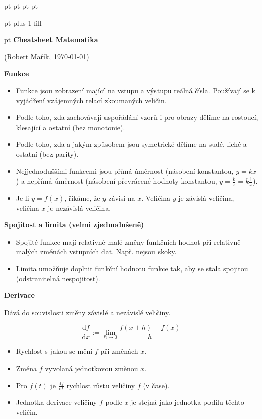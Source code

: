 \documentclass{article}
\begin{document}
 pt
 pt
\let\phi\varphi
\footnotesize
{} pt
 pt
\begin{multicols}{3}
 pt plus 1 fill

{\centering {} pt
\textbf{Cheatsheet Matematika}

(Robert Mařík, \today)

}

\textbf{Funkce}
\vspace*{-\baselineskip}
\begin{itemize}
\item Funkce jsou zobrazení mající na vstupu a výstupu reálná čísla. Používají se k vyjádření vzájemných relací zkoumaných veličin.
\item Podle  toho, zda zachovávají uspořádání vzorů i pro obrazy dělíme na rostoucí, klesající a ostatní (bez monotonie).
\item Podle toho, zda a jakým způsobem jsou symetrické dělíme na sudé, liché a ostatní (bez parity).
\item Nejjednoduššími funkcemi jsou přímá úměrnost (násobení konstantou, $y=kx$) a nepřímá úměrnost (násobení převrácené hodnoty konstantou, $y=\frac kx=k\frac 1x$).
\item Je-li $y=f(x)$, říkáme, že $y$ závisí na $x$. Veličina $y$ je závislá veličina, veličina $x$ je nezávislá veličina.
\end{itemize}

\textbf{Spojitost a limita (velmi zjednodušeně)}
\vspace*{-\baselineskip}
\begin{itemize}
\item Spojité funkce mají relativně malé změny funkčních hodnot při relativně malých změnách vstupních dat. Např. nejsou skoky.
\item Limita umožňuje doplnit funkční hodnotu funkce tak, aby se stala spojitou (odstranitelná nespojitost).
\end{itemize}

\textbf{Derivace}
\vspace*{-\baselineskip}

Dává do souvislosti změny závislé a nezávislé veličiny. 

$$\frac{\mathrm df}{\mathrm dx}:=\lim_{h\to 0}\frac{f(x+h)-f(x)}{h}$$

\begin{itemize}
\item Rychlost s jakou se mění $f$ při změnách $x$.
\item Změna $f$ vyvolaná jednotkovou změnou $x$.
\item Pro $f(t)$ je $\frac{\mathrm df}{\mathrm dt}$ rychlost růstu veličiny $f$ (v čase).
\item Jednotka derivace veličiny $f$ podle $x$ je stejná jako jednotka podílu těchto veličin.
\end{itemize}


\end{multicols}
\end{document}
